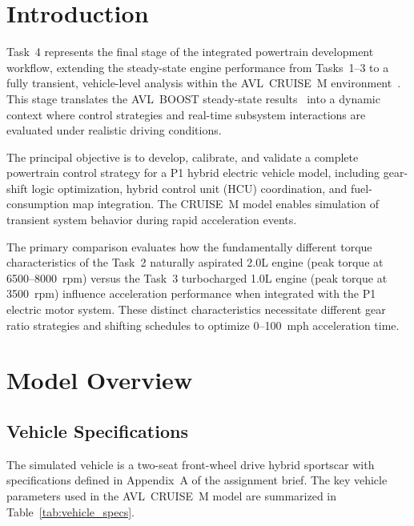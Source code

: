 \label{ch:task4}

\section{Introduction}

Task~4 represents the final stage of the integrated powertrain development workflow, extending the steady-state engine performance from Tasks~1--3 to a fully transient, vehicle-level analysis within the AVL~CRUISE~M environment~\cite{avl_cruise}. This stage translates the AVL~BOOST steady-state results~\cite{avl_boost} into a dynamic context where control strategies and real-time subsystem interactions are evaluated under realistic driving conditions.

\vspace{0.8em}

The principal objective is to develop, calibrate, and validate a complete powertrain control strategy for a P1 hybrid electric vehicle model, including gear-shift logic optimization, hybrid control unit (HCU) coordination, and fuel-consumption map integration. The CRUISE~M model enables simulation of transient system behavior during rapid acceleration events.

\vspace{0.8em}

The primary comparison evaluates how the fundamentally different torque characteristics of the Task~2 naturally aspirated 2.0L engine (peak torque at 6500--8000~rpm) versus the Task~3 turbocharged 1.0L engine (peak torque at 3500~rpm) influence acceleration performance when integrated with the P1 electric motor system. These distinct characteristics necessitate different gear ratio strategies and shifting schedules to optimize 0--100~mph acceleration time.

\section{Model Overview}

\subsection{Vehicle Specifications}

The simulated vehicle is a two-seat front-wheel drive hybrid sportscar with specifications defined in Appendix~A of the assignment brief. The key vehicle parameters used in the AVL~CRUISE~M model are summarized in Table~\ref{tab:vehicle_specs}.

